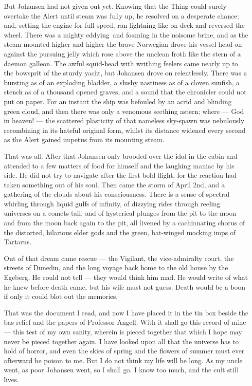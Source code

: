But Johansen had not given out yet. Knowing that the Thing could surely
overtake the Alert until steam was fully up, he resolved on a desperate
chance; and, setting the engine for full speed, ran lightning-like on
deck and reversed the wheel. There was a mighty eddying\est\ and foaming in
the noisome brine, and as the steam mounted higher and higher the brave
Norwegian drove his vessel head on against the pursuing jelly which rose
above the unclean froth like the stern of a daemon galleon. The awful
squid-head with writhing feelers came nearly up to the bowsprit of the
sturdy yacht, but Johansen drove on relentlessly. There was a bursting
as of an exploding bladder, a slushy nastiness as of a cloven sunfish, a
stench as of a thousand opened graves, and a sound that the chronicler
could not put on paper. For an instant the ship was befouled by an acrid
and blinding green cloud, and then there was only a venomous seething
astern; where --- God in heaven! --- the scattered plasticity of that
nameless sky-spawn was nebulously recombining in its hateful original
form, whilst its distance widened every second as the Alert gained
impetus from its mounting steam.

That was all. After that Johansen only brooded over the idol in the
cabin and attended to a few matters of food for himself and the laughing
maniac by his side. He did not try to navigate after the first bold
flight, for the reaction had taken something out of his soul. Then came
the storm of April 2nd, and a gathering of the clouds about his
consciousness. There is a sense of spectral whirling through liquid
gulfs of infinity, of dizzying rides through reeling universes on a
comets tail, and of hysterical plunges from the pit to the moon and from
the moon back again to the pit, all livened by a cachinnating chorus of
the distorted, hilarious elder gods and the green, bat-winged mocking
imps of Tartarus.

Out of that dream came rescue --- the Vigilant, the vice-admiralty court,
the streets of Dunedin, and the long voyage back home to the old house
by the Egeberg. He could not tell --- they would think him mad. He would
write of what he knew before death came, but his wife must not guess.
Death would be a boon if only it could blot out the memories.

That was the document I read, and now I have placed it in the tin box
beside the bas-relief and the papers of Professor Angell. With it shall
go this record of mine --- this test of my own sanity, wherein is pieced
together that which I hope may never be pieced together again. I have
looked upon all that the universe has to hold of horror, and even the
skies of spring and the flowers of summer must ever afterward be poison
to me. But I do not think my life will be long. As my uncle went, as
poor Johansen went, so I shall go. I know too much, and the cult still
lives.

